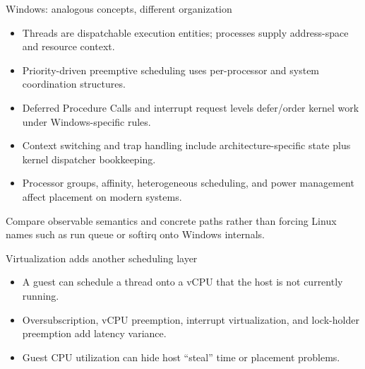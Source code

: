 \documentclass[aspectratio=169,11pt]{beamer}
\begin{document}
\begin{frame}{Windows: analogous concepts, different organization}
  \begin{itemize}
    \item Threads are dispatchable execution entities; processes supply address-space and resource context.
    \item Priority-driven preemptive scheduling uses per-processor and system coordination structures.
    \item Deferred Procedure Calls and interrupt request levels defer/order kernel work under Windows-specific rules.
    \item Context switching and trap handling include architecture-specific state plus kernel dispatcher bookkeeping.
    \item Processor groups, affinity, heterogeneous scheduling, and power management affect placement on modern systems.
  \end{itemize}
  \begin{tcolorbox}[title=Comparison discipline]
    Compare observable semantics and concrete paths rather than forcing Linux names such as run queue or softirq onto Windows internals.
  \end{tcolorbox}
\end{frame}

\begin{frame}{Virtualization adds another scheduling layer}
  \centering
  \begin{itemize}
    \item A guest can schedule a thread onto a vCPU that the host is not currently running.
    \item Oversubscription, vCPU preemption, interrupt virtualization, and lock-holder preemption add latency variance.
    \item Guest CPU utilization can hide host ``steal'' time or placement problems.
  \end{itemize}
\end{frame}
\end{document}
